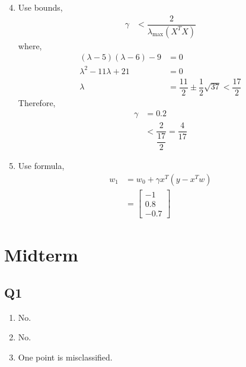 \documentclass{article}
\begin{document}
\begin{enumerate}
\setcounter{enumii}{3}
\item Use bounds,
\begin{align*}
\gamma &< \dfrac{2}{\lambda_{\displaystyle\max} \left(X^{T} X\right)}
\end{align*}
where,
\begin{align*}
\left(\lambda - 5\right)\left(\lambda - 6\right) - 9 &= 0
\\ \lambda^{2} - 11 \lambda + 21 &= 0
\\ \lambda &= \dfrac{11}{2} \pm \dfrac{1}{2} \sqrt{37} < \dfrac{17}{2}
\end{align*}
Therefore,
\begin{align*}
\gamma &= 0.2
\\ &< \dfrac{2}{\dfrac{17}{2}} = \dfrac{4}{17}
\end{align*}
\item Use formula,
\begin{align*}
w_{1} &= w_{0} + \gamma x^{T} \left(y - x^{T} w\right)
\\ &= \begin{bmatrix} -1 \\ 0.8 \\ -0.7 \end{bmatrix}
\end{align*}

\end{enumerate}




\section{Midterm} 


\subsection{Q1}
\begin{enumerate}
\item No.
\end{enumerate}

\begin{enumerate}
\setcounter{enumii}{1}
\item No.
\end{enumerate}

\begin{enumerate}
\setcounter{enumii}{2}
\item One point is misclassified.
\end{enumerate}
\end{document}
